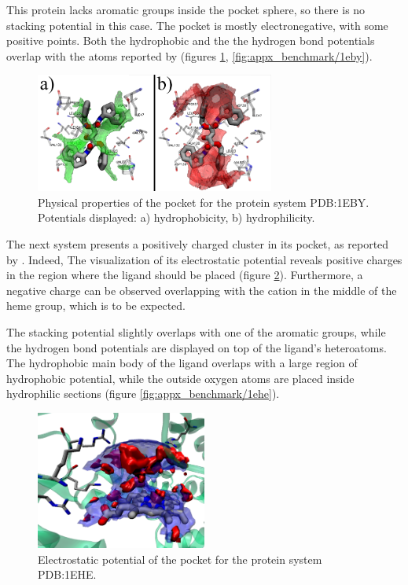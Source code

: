     This protein lacks aromatic groups inside the pocket sphere, so there is no stacking potential in this case. The pocket is mostly electronegative, with some positive points. Both the hydrophobic and the the hydrogen bond potentials overlap with the atoms reported by \cite{benchmark_strong_2021} (figures \ref{fig:benchmark/1eby}, \ref{fig:appx_benchmark/1eby}).

    \begin{figure}[H]
      \centering
      \includegraphics[width=0.7\textwidth]{figures/results/benchmark_prot/1eby.png}
      \caption{\label{fig:benchmark/1eby} Physical properties of the pocket for the protein system PDB:1EBY. Potentials displayed: a) hydrophobicity, b) hydrophilicity.}
    \end{figure}

    The next system presents a positively charged cluster in its pocket, as reported by \cite{benchmark_positive_2001}. Indeed, The visualization of its electrostatic potential reveals positive charges in the region where the ligand should be placed (figure \ref{fig:benchmark/1ehe}). Furthermore, a negative charge can be observed overlapping with the cation in the middle of the heme group, which is to be expected.

    The stacking potential slightly overlaps with one of the aromatic groups, while the hydrogen bond potentials are displayed on top of the ligand's heteroatoms. The hydrophobic main body of the ligand overlaps with a large region of hydrophobic potential, while the outside oxygen atoms are placed inside hydrophilic sections (figure \ref{fig:appx_benchmark/1ehe}).

    \begin{figure}[H]
      \centering
      \includegraphics[width=0.5\textwidth]{figures/results/benchmark_prot/1ehe.png}
      \caption{\label{fig:benchmark/1ehe} Electrostatic potential of the pocket for the protein system PDB:1EHE.}
    \end{figure}

